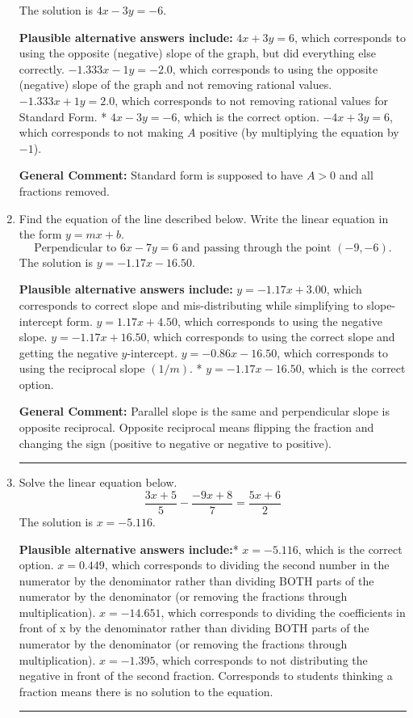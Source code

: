 \documentclass{extbook}[14pt]
\newcommand{\litem}[1]{\item #1

\rule{\textwidth}{0.4pt}}
\begin{document}
\begin{enumerate}
{The solution is \( 4x - 3y = -6 \).\begin{enumerate}[label=\Alph*.]
\textbf{Plausible alternative answers include:} $4x + 3y = 6$, which corresponds to using the opposite (negative) slope of the graph, but did everything else correctly.
 $-1.333x - 1y = -2.0$, which corresponds to using the opposite (negative) slope of the graph and not removing rational values.
 $-1.333x + 1y = 2.0$, which corresponds to not removing rational values for Standard Form.
* $4x - 3y = -6$, which is the correct option.
 $-4x + 3y = 6$, which corresponds to not making $A$ positive (by multiplying the equation by $-1$).
\end{enumerate}

\textbf{General Comment:} Standard form is supposed to have $A > 0$ and all fractions removed.
}
\litem{
Find the equation of the line described below. Write the linear equation in the form $y=mx+b$.
\[ \text{Perpendicular to } 6 x - 7 y = 6 \text{ and passing through the point } (-9, -6). \]The solution is \( y = -1.17x - 16.50 \).\begin{enumerate}[label=\Alph*.]
\textbf{Plausible alternative answers include:} $y = -1.17x + 3.00$, which corresponds to correct slope and mis-distributing while simplifying to slope-intercept form.
 $y = 1.17x + 4.50$, which corresponds to using the negative slope.
 $y = -1.17x + 16.50$, which corresponds to using the correct slope and getting the negative $y$-intercept.
 $y = -0.86x - 16.50$, which corresponds to using the reciprocal slope $(1/m)$.
* $y = -1.17x - 16.50$, which is the correct option.
\end{enumerate}

\textbf{General Comment:} Parallel slope is the same and perpendicular slope is opposite reciprocal. Opposite reciprocal means flipping the fraction and changing the sign (positive to negative or negative to positive).
}
\litem{
Solve the linear equation below.
\[ \frac{3x + 5}{5} - \frac{-9x + 8}{7} = \frac{5x + 6}{2} \]The solution is \( x = -5.116 \).\begin{enumerate}[label=\Alph*.]
\textbf{Plausible alternative answers include:}* $x = -5.116$, which is the correct option.
 $x = 0.449$, which corresponds to dividing the second number in the numerator by the denominator rather than dividing BOTH parts of the numerator by the denominator (or removing the fractions through multiplication).
 $x = -14.651$, which corresponds to dividing the coefficients in front of x by the denominator rather than dividing BOTH parts of the numerator by the denominator (or removing the fractions through multiplication).
 $x = -1.395$, which corresponds to not distributing the negative in front of the second fraction.
Corresponds to students thinking a fraction means there is no solution to the equation.
\end{enumerate}

}
\end{enumerate}
\end{document}
